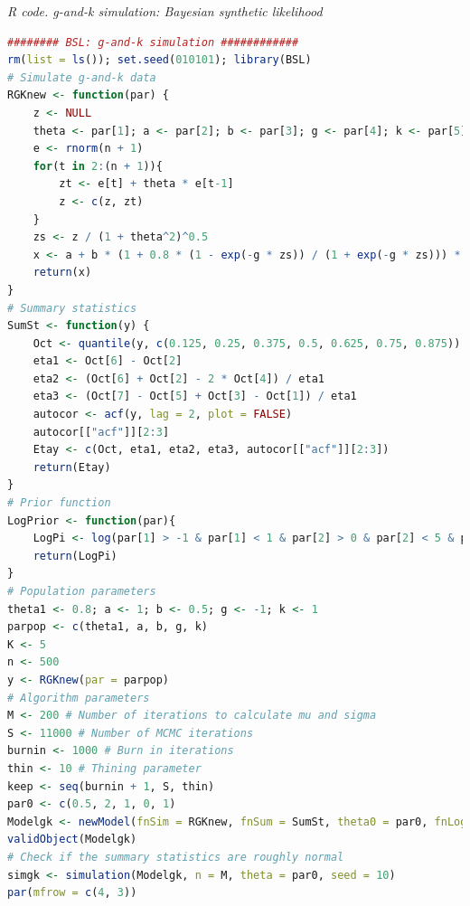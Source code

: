 \begin{tcolorbox}[enhanced,width=4.67in,center upper,
	fontupper=\large\bfseries,drop shadow southwest,sharp corners]
	\textit{R code. g-and-k simulation: Bayesian synthetic likelihood}
	\begin{VF}
		\begin{lstlisting}[language=R]
######## BSL: g-and-k simulation ############
rm(list = ls()); set.seed(010101); library(BSL)
# Simulate g-and-k data
RGKnew <- function(par) {
	z <- NULL
	theta <- par[1]; a <- par[2]; b <- par[3]; g <- par[4]; k <- par[5]
	e <- rnorm(n + 1)
	for(t in 2:(n + 1)){
		zt <- e[t] + theta * e[t-1]
		z <- c(z, zt)
	}
	zs <- z / (1 + theta^2)^0.5
	x <- a + b * (1 + 0.8 * (1 - exp(-g * zs)) / (1 + exp(-g * zs))) * (1 + zs^2)^k * zs
	return(x)
}
# Summary statistics
SumSt <- function(y) {
	Oct <- quantile(y, c(0.125, 0.25, 0.375, 0.5, 0.625, 0.75, 0.875))
	eta1 <- Oct[6] - Oct[2]
	eta2 <- (Oct[6] + Oct[2] - 2 * Oct[4]) / eta1
	eta3 <- (Oct[7] - Oct[5] + Oct[3] - Oct[1]) / eta1
	autocor <- acf(y, lag = 2, plot = FALSE)
	autocor[["acf"]][2:3]
	Etay <- c(Oct, eta1, eta2, eta3, autocor[["acf"]][2:3])
	return(Etay)
}
# Prior function
LogPrior <- function(par){
	LogPi <- log(par[1] > -1 & par[1] < 1 & par[2] > 0 & par[2] < 5 & par[3] > 0 & par[3] < 5 & par[4] > -5 & par[4] < 5 & par[5] > -0.5 & par[5] < 5)
	return(LogPi)
}
# Population parameters
theta1 <- 0.8; a <- 1; b <- 0.5; g <- -1; k <- 1
parpop <- c(theta1, a, b, g, k)
K <- 5
n <- 500
y <- RGKnew(par = parpop)
# Algorithm parameters
M <- 200 # Number of iterations to calculate mu and sigma
S <- 11000 # Number of MCMC iterations
burnin <- 1000 # Burn in iterations
thin <- 10 # Thining parameter
keep <- seq(burnin + 1, S, thin)
par0 <- c(0.5, 2, 1, 0, 1) 
Modelgk <- newModel(fnSim = RGKnew, fnSum = SumSt, theta0 = par0, fnLogPrior = LogPrior, verbose = FALSE)
validObject(Modelgk)
# Check if the summary statistics are roughly normal
simgk <- simulation(Modelgk, n = M, theta = par0, seed = 10)
par(mfrow = c(4, 3))
\end{lstlisting}
	\end{VF}
\end{tcolorbox}

